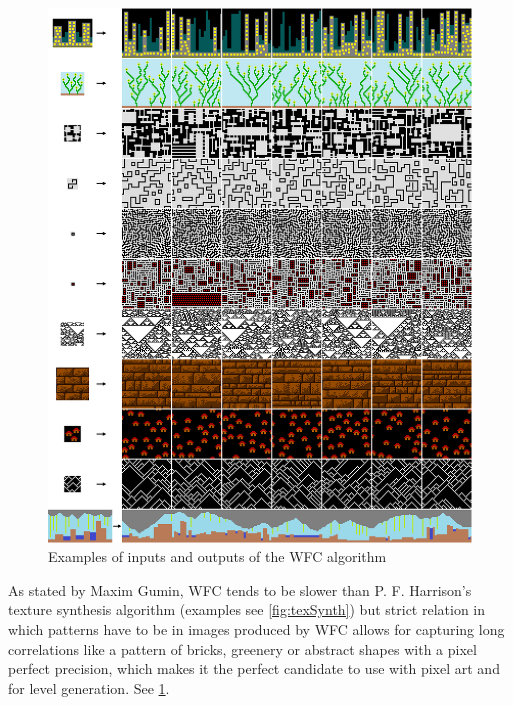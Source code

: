 \documentclass[shortabstract, english, inz]{iithesis}
\begin{document}
\begin{figure}[H]
\centering
\includegraphics[width=1\textwidth, angle=0]{images/wfc.png}
\caption{Examples of inputs and outputs of the WFC algorithm \cite{MaximGumin}}
\label{fig:wfc}
\end{figure}
As stated by Maxim Gumin, WFC tends to be slower than P. F. Harrison's texture synthesis algorithm (examples see \ref{fig:texSynth}) but strict relation in which patterns have to be in images produced by WFC allows for capturing long correlations like a pattern of bricks, greenery or abstract shapes with a pixel perfect precision, which makes it the perfect candidate to use with pixel art and for level generation. See \ref{fig:wfc}. \cite{MaximGumin}
\end{document}
